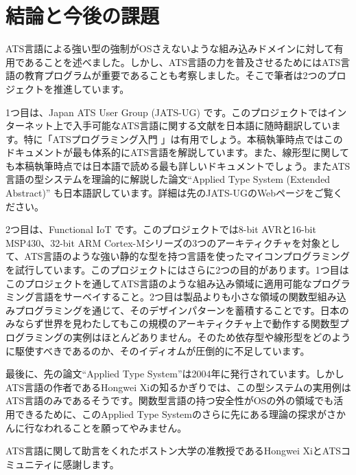 \documentclass{ipsjprosym}
\begin{document}
\section{結論と今後の課題}

ATS言語による強い型の強制がOSさえないような組み込みドメインに対して有用であることを述べました。しかし、ATS言語の力を普及させるためにはATS言語の教育プログラムが重要であることも考察しました。そこで筆者は2つのプロジェクトを推進しています。

1つ目は、Japan ATS User Group (JATS-UG) \cite{jats-ug} です。このプロジェクトではインターネット上で入手可能なATS言語に関する文献を日本語に随時翻訳しています。特に「ATSプログラミング入門 \cite{INT2PROGINATS-J}」は有用でしょう。本稿執筆時点ではこのドキュメントが最も体系的にATS言語を解説しています。また、線形型に関しても本稿執筆時点では日本語で読める最も詳しいドキュメントでしょう。またATS言語の型システムを理論的に解説した論文``Applied Type System (Extended Abstract)'' \cite{ATStypes03} も日本語訳しています。詳細は先のJATS-UGのWebページをご覧ください。

2つ目は、Functional IoT \cite{fpiot} です。このプロジェクトでは8-bit AVRと16-bit MSP430、32-bit ARM Cortex-Mシリーズの3つのアーキティクチャを対象として、ATS言語のような強い静的な型を持つ言語を使ったマイコンプログラミングを試行しています。このプロジェクトにはさらに2つの目的があります。1つ目はこのプロジェクトを通してATS言語のような組み込み領域に適用可能なプログラミング言語をサーベイすること。2つ目は製品よりも小さな領域の関数型組み込みプログラミングを通じて、そのデザインパターンを蓄積することです。日本のみならず世界を見わたしてもこの規模のアーキティクチャ上で動作する関数型プログラミングの実例はほとんどありません。そのため依存型や線形型をどのように駆使すべきであるのか、そのイディオムが圧倒的に不足しています。

最後に、先の論文``Applied Type System''は2004年に発行されています。しかしATS言語の作者であるHongwei Xiの知るかぎりでは、この型システムの実用例はATS言語のみであるそうです。関数型言語の持つ安全性がOSの外の領域でも活用できるために、このApplied Type Systemのさらに先にある理論の探求がさかんに行なわれることを願ってやみません。

\begin{acknowledgment}
ATS言語に関して助言をくれたボストン大学の准教授であるHongwei XiとATSコミュニティに感謝します。
\end{acknowledgment}
\end{document}
